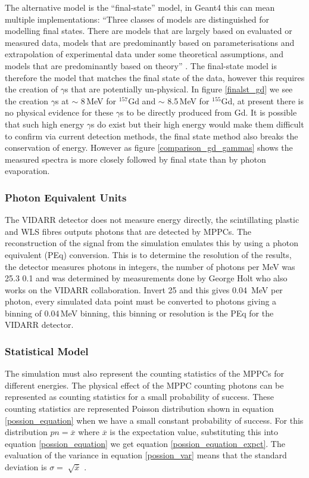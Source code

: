 \documentclass[12pt,a4paper]{article}
\begin{document}
The alternative model is the ``final-state'' model, in Geant4 this can mean multiple implementations: ``Three classes of models are distinguished for modelling final states. There are models that are largely based on evaluated or measured data, models that are predominantly based on parameterisations and extrapolation of experimental data under some theoretical assumptions, and models that are predominantly based on theory'' \cite{geant4_ref}. The final-state model is therefore the model that matches the final state of the data, however this requires the creation of $\gamma$s that are potentially un-physical. In figure \ref{finalst_gd} we see the creation $\gamma$s at $\sim$ 8\,MeV for $^{157}$Gd and $\sim$ 8.5\,MeV for $^{155}$Gd, at present there is no physical evidence for these $\gamma$s to be directly produced from Gd. It is possible that such high energy $\gamma$s do exist but their high energy would make them difficult to confirm via current detection methods, the final state method also breaks the conservation of energy. However as figure \ref{comparison_gd_gammas} shows the measured spectra is more closely followed by final state than by photon evaporation.


\subsubsection{Photon Equivalent Units}
The VIDARR detector does not measure energy directly, the scintillating plastic and WLS fibres outputs photons that are detected by MPPCs. The reconstruction of the signal from the simulation emulates this by using a photon equivalent (PEq) conversion. This is to determine the resolution of the results, the detector measures photons in integers, the number of photons per MeV was 25.3\,\pm\,0.1 and was determined by measurements done by George Holt who also works on the VIDARR collaboration. Invert 25  and this gives 0.04 \,MeV per photon, every simulated data point must be converted to photons giving a binning of 0.04\,MeV binning, this binning or resolution is the PEq for the VIDARR detector. %

\subsubsection{Statistical Model}
The simulation must also represent the counting statistics of the MPPCs for different energies. The physical effect of the MPPC counting photons can be represented as counting statistics for a small probability of success. These counting statistics are represented Poisson distribution shown in equation \ref{possion_equation} when we have a small constant probability of success. For this distribution $pn = \overline{x}$ where $\overline{x}$ is the expectation value, substituting this into equation \ref{possion_equation} we get equation \ref{possion_equation_expct}. The evaluation of the variance in equation \ref{possion_var} means that the standard deviation is $\sigma=\sqrt[]{\overline{x}}$ \cite{rad_det_and_meas}.
\end{document}
